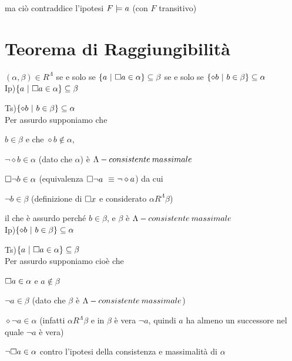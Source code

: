 ma ciò contraddice l'ipotesi $F\models a$ (con $F$ transitivo) \lightning\\



\section{Teorema di Raggiungibilità}

$(\alpha,\beta)\in R^{\Lambda}$ se e solo se $\{a\ |\ \square a\in\alpha\}\subseteq\beta$
se e solo se \foreignlanguage{english}{$\{\diamond b\ |\ b\in\beta\}\subseteq\alpha$}
\\
Ip)$\{a\ |\ \square a\in\alpha\}\subseteq\beta$

Ts)$\{\diamond b\ |\ b\in\beta\}\subseteq\alpha$\\


Per assurdo supponiamo che

$b\in\beta$ e che $\diamond b\notin\alpha$, 

%
$\neg\diamond b\in\alpha$\foreignlanguage{italian}{ (dato che $\alpha$)
è $\Lambda-consistente\: massimale$}

%
$\square\neg b\in\alpha$ (equivalenza $\square\neg a$ $\equiv$$\neg\diamond a$)
da cui

$\neg b\in\beta$ (definizione di $\square x$ e considerato $\alpha R^{\Lambda}\beta$)

il che è assurdo perché $b\in\beta$, e $\beta$ è $\Lambda-consistente\: massimale$\lightning\\


Ip)$\{\diamond b\ |\ b\in\beta\}\subseteq\alpha$

Ts)$\{a\ |\ \square a\in\alpha\}\subseteq\beta$\\
Per assurdo supponiamo cioè che

$\square a\in\alpha$ e $a\notin\beta$

$\neg a\in\beta$ (dato che $\beta$ è $\Lambda-consistente\: massimale$)

$\diamond\neg a\in\alpha$ (infatti $\alpha R^{\Lambda}\beta$ e in
$\beta$ è vera $\neg a$, quindi $a$ ha almeno un successore nel
quale $\neg a$ è vera)

$\neg\square a\in\alpha$ contro l'ipotesi della consistenza e massimalità
di $\alpha$\lightning\\




